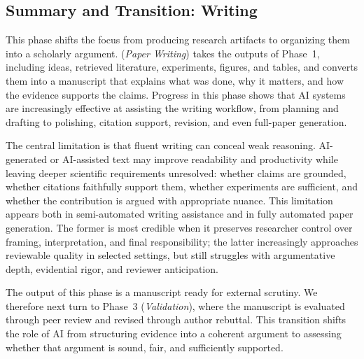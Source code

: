 \subsection{Summary and Transition: Writing}

\label{sec:writing_summary}

This phase shifts the focus from producing research artifacts to organizing them into a scholarly argument. \Sfive (\emph{Paper Writing}) takes the outputs of Phase~1, including ideas, retrieved literature, experiments, figures, and tables, and converts them into a manuscript that explains what was done, why it matters, and how the evidence supports the claims. Progress in this phase shows that AI systems are increasingly effective at assisting the writing workflow, from planning and drafting to polishing, citation support, revision, and even full-paper generation.

The central limitation is that fluent writing can conceal weak reasoning. AI-generated or AI-assisted text may improve readability and productivity while leaving deeper scientific requirements unresolved: whether claims are grounded, whether citations faithfully support them, whether experiments are sufficient, and whether the contribution is argued with appropriate nuance. This limitation appears both in semi-automated writing assistance and in fully automated paper generation. The former is most credible when it preserves researcher control over framing, interpretation, and final responsibility; the latter increasingly approaches reviewable quality in selected settings, but still struggles with argumentative depth, evidential rigor, and reviewer anticipation.

The output of this phase is a manuscript ready for external scrutiny. We therefore next turn to Phase~3 (\emph{Validation}), where the manuscript is evaluated through peer review and revised through author rebuttal. This transition shifts the role of AI from structuring evidence into a coherent argument to assessing whether that argument is sound, fair, and sufficiently supported.